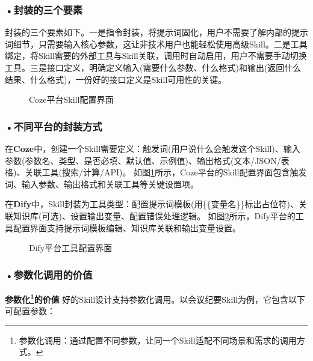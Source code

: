 \subsubsection*{\textbf{•封装的三个要素}}

封装的三个要素如下。一是指令封装，将提示词固化，用户不需要了解内部的提示词细节，只需要输入核心参数，这让非技术用户也能轻松使用高级Skill。二是工具绑定，将Skill需要的外部工具与Skill关联，调用时自动启用，用户不需要手动切换工具。三是接口定义，明确定义输入(需要什么参数、什么格式)和输出(返回什么结果、什么格式)，一份好的接口定义是Skill可用性的关键。



\begin{figure}[H]
\centering
{}
\caption{Coze平台Skill配置界面}
\label{fig:ch3_3_18}
\end{figure}


\subsubsection*{\textbf{•不同平台的封装方式}}

在\textbf{Coze}中，创建一个Skill需要定义：触发词(用户说什么会触发这个Skill)、输入参数(参数名、类型、是否必填、默认值、示例值)、输出格式(文本/JSON/表格)、关联工具(搜索/计算/API)。 如图\ref{fig:ch3_3_18}所示，Coze平台的Skill配置界面包含触发词、输入参数、输出格式和关联工具等关键设置项。


在\textbf{Dify}中，Skill封装为工具类型：配置提示词模板(用\{\{变量名\}\}标出占位符)、关联知识库(可选)、设置输出变量、配置错误处理逻辑。 如图\ref{fig:ch3_3_19}所示，Dify平台的工具配置界面支持提示词模板编辑、知识库关联和输出变量设置。

\begin{figure}[H]
\centering
{}
\caption{Dify平台工具配置界面}
\label{fig:ch3_3_19}
\end{figure}


\subsubsection*{\textbf{•参数化调用的价值}}
\textbf{参数化\footnote{参数化调用：通过配置不同参数，让同一个Skill适配不同场景和需求的调用方式。}的价值 } 好的Skill设计支持参数化调用。以会议纪要Skill为例，它包含以下可配置参数：


